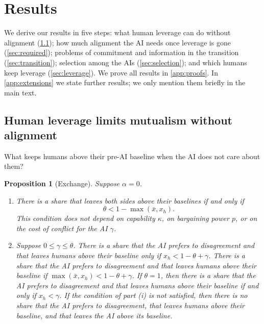\documentclass[article, 11pt, reqno]{amsart}
\newtheorem{proposition}[theorem]{Proposition}
\theoremstyle{named}
\theoremstyle{plain}
\begin{document}
\section{Results}\label{sec:results}

We derive our results in five steps: what human leverage can do without alignment (\cref{sec:exchange}); how much alignment the AI needs once leverage is gone (\cref{sec:required}); problems of commitment and information in the transition (\cref{sec:transition}); selection among the AIs (\cref{sec:selection}); and which humans keep leverage (\cref{sec:leverage}). We prove all results in \cref{app:proofs}. In \cref{app:extensions} we state further results; we only mention them briefly in the main text.

\subsection{Human leverage limits mutualism without alignment}\label{sec:exchange}

What keeps humans above their pre-AI baseline when the AI does not care about them?

\begin{proposition}[Exchange]\label{prop:exchange}
Suppose $\alpha = 0$.
\begin{enumerate}
\item[(i)] There is a share that leaves both sides above their baselines if and only if
\[
\theta < 1 - \max(\bar{x}, x_h).
\]
This condition does not depend on capability $\kappa$, on bargaining power $p$, or on the cost of conflict for the AI $\gamma$.
\item[(ii)] Suppose $0 \le \gamma \le \theta$. There is a share that the AI prefers to disagreement and that leaves humans above their baseline only if $x_h < 1 - \theta + \gamma$. There is a share that the AI prefers to disagreement and that leaves humans above their baseline if $\max(\bar{x}, x_h) < 1 - \theta + \gamma$. If $\theta = 1$, then there is a share that the AI prefers to disagreement and that leaves humans above their baseline if and only if $x_h < \gamma$. If the condition of part (i) is not satisfied, then there is no share that the AI prefers to disagreement, that leaves humans above their baseline, and that leaves the AI above its baseline.
\end{enumerate}
\end{proposition}
\end{document}
